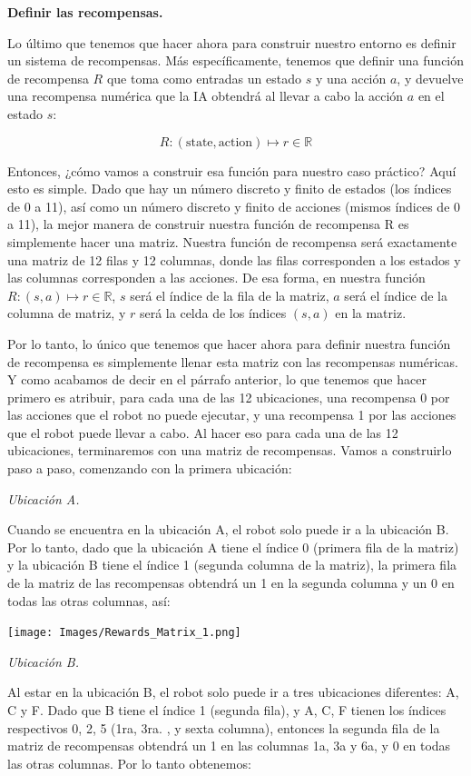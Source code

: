 \documentclass[
]{book}
\begin{document}
\textbf{Definir las recompensas.}

Lo último que tenemos que hacer ahora para construir nuestro entorno es definir un sistema de recompensas. Más específicamente, tenemos que definir una función de recompensa \(R\) que toma como entradas un estado \(s\) y una acción \(a\), y devuelve una recompensa numérica que la IA obtendrá al llevar a cabo la acción \(a\) en el estado \(s\):

\[R : (\textrm{state}, \textrm{action}) \mapsto r \in \mathbb{R}\]

Entonces, ¿cómo vamos a construir esa función para nuestro caso práctico? Aquí esto es simple. Dado que hay un número discreto y finito de estados (los índices de 0 a 11), así como un número discreto y finito de acciones (mismos índices de 0 a 11), la mejor manera de construir nuestra función de recompensa R es simplemente hacer una matriz. Nuestra función de recompensa será exactamente una matriz de 12 filas y 12 columnas, donde las filas corresponden a los estados y las columnas corresponden a las acciones. De esa forma, en nuestra función \(R: (s, a) \mapsto r \in \mathbb{R}\), \(s\) será el índice de la fila de la matriz, \(a\) será el índice de la columna de matriz, y \(r\) será la celda de los índices \((s, a)\) en la matriz.

Por lo tanto, lo único que tenemos que hacer ahora para definir nuestra función de recompensa es simplemente llenar esta matriz con las recompensas numéricas. Y como acabamos de decir en el párrafo anterior, lo que tenemos que hacer primero es atribuir, para cada una de las 12 ubicaciones, una recompensa 0 por las acciones que el robot no puede ejecutar, y una recompensa 1 por las acciones que el robot puede llevar a cabo. Al hacer eso para cada una de las 12 ubicaciones, terminaremos con una matriz de recompensas. Vamos a construirlo paso a paso, comenzando con la primera ubicación:

\emph{Ubicación A.}

Cuando se encuentra en la ubicación A, el robot solo puede ir a la ubicación B. Por lo tanto, dado que la ubicación A tiene el índice 0 (primera fila de la matriz) y la ubicación B tiene el índice 1 (segunda columna de la matriz), la primera fila de la matriz de las recompensas obtendrá un 1 en la segunda columna y un 0 en todas las otras columnas, así:

\texttt{[image: Images/Rewards\_Matrix\_1.png]}

\emph{Ubicación B.}

Al estar en la ubicación B, el robot solo puede ir a tres ubicaciones diferentes: A, C y F. Dado que B tiene el índice 1 (segunda fila), y A, C, F tienen los índices respectivos 0, 2, 5 (1ra, 3ra. , y sexta columna), entonces la segunda fila de la matriz de recompensas obtendrá un 1 en las columnas 1a, 3a y 6a, y 0 en todas las otras columnas. Por lo tanto obtenemos:
\end{document}
